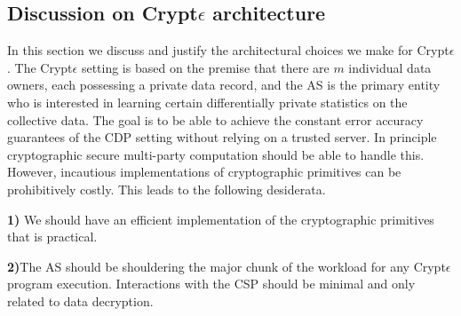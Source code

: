 \subsection{Discussion on Crypt$\epsilon$ architecture}


In this section we discuss and justify the architectural choices we make for Crypt$\epsilon$. The Crypt$\epsilon$ setting is based on the premise that there are $m$ individual data owners, each possessing a private data record, and the \textsf{AS} is the primary entity who is interested in learning certain differentially private statistics on the collective data. The goal is to be able to achieve the constant error accuracy guarantees of the \textsf{CDP} setting without relying on a trusted server. In principle cryptographic secure multi-party computation should be able to handle this. However, incautious implementations of cryptographic primitives can be prohibitively costly. This leads to the following desiderata.

\textbf{1)} We should have an efficient implementation of the cryptographic primitives that is practical.

\textbf{2)}The \textsf{AS} should be shouldering the major chunk of the workload for any Crypt$\epsilon$ program execution. Interactions with the \textsf{CSP} should be minimal and only related to data decryption.

